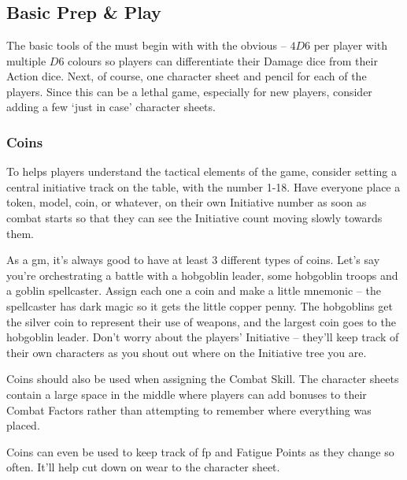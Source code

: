 \chapter{}

\section{Basic Prep \& Play}

\begin{multicols}{2}

\noindent
The basic tools of the  must begin with with the obvious -- $4D6$ per player with multiple $D6$ colours so players can differentiate their Damage dice from their Action dice.
Next, of course, one character sheet and pencil for each of the players.
Since this can be a lethal game, especially for new players, consider adding a few `just in case' character sheets.

\subsection{Coins}

To helps players understand the tactical elements of the game, consider setting a central initiative track on the table, with the number 1-18.
Have everyone place a token, model, coin, or whatever, on their own Initiative number as soon as combat starts so that they can see the Initiative count moving slowly towards them.

As a \gls{gm}, it's always good to have at least 3 different types of coins.
Let's say you're orchestrating a battle with a hobgoblin leader, some hobgoblin troops and a goblin spellcaster.
Assign each one a coin and make a little mnemonic -- the spellcaster has dark magic so it gets the little copper penny.
The hobgoblins get the silver coin to represent their use of weapons, and the largest coin goes to the hobgoblin leader.
Don't worry about the players' Initiative -- they'll keep track of their own characters as you shout out where on the Initiative tree you are.

Coins should also be used when assigning the Combat Skill.
The character sheets contain a large space in the middle where players can add bonuses to their Combat Factors rather than attempting to remember where everything was placed.

Coins can even be used to keep track of \gls{fp} and Fatigue Points as they change so often.
It'll help cut down on wear to the character sheet.


\end{multicols}
